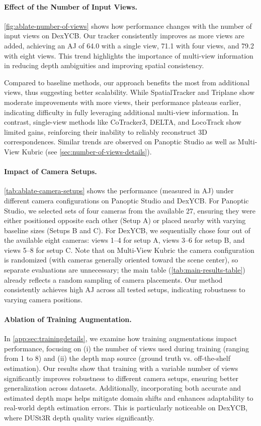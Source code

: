 \documentclass[10pt,twocolumn,letterpaper]{article}
\begin{document}
\paragraph{Effect of the Number of Input Views.}  
\cref{fig:ablate-number-of-views} shows how performance changes with the number of input views on DexYCB. Our tracker consistently improves as more views are added, achieving an AJ of 64.0 with a single view, 71.1 with four views, and 79.2 with eight views. This trend highlights the importance of multi-view information in reducing depth ambiguities and improving spatial consistency.

Compared to baseline methods, our approach benefits the most from additional views, thus suggesting better scalability. While SpatialTracker and Triplane show moderate improvements with more views, their performance plateaus earlier, indicating difficulty in fully leveraging additional multi-view information. In contrast, single-view methods like CoTracker3, DELTA, and LocoTrack show limited gains, reinforcing their inability to reliably reconstruct 3D correspondences. Similar trends are observed on Panoptic Studio as well as Multi-View Kubric (see \cref{sec:number-of-views-details}).


\paragraph{Impact of Camera Setups.}  
\cref{tab:ablate-camera-setups} shows the performance (measured in AJ) under different camera configurations on Panoptic Studio and DexYCB. For Panoptic Studio, we selected sets of four cameras from the available 27, ensuring they were either positioned opposite each other (Setup A) or placed nearby with varying baseline sizes (Setups B and C). For DexYCB, we sequentially chose four out of the available eight cameras: views 1--4 for setup A, views 3--6 for setup B, and views 5--8 for setup C. Note that on Multi-View Kubric the camera configuration is randomized (with cameras generally oriented toward the scene center), so separate evaluations are unnecessary; the main table (\cref{tab:main-results-table}) already reflects a random sampling of camera placements. Our method consistently achieves high AJ across all tested setups, indicating robustness to varying camera positions.

\paragraph{Ablation of Training Augmentation.}
In \cref{app:sec:trainingdetails}, we examine how training augmentations impact performance, focusing on (i) the number of views used during training (ranging from 1 to 8) and (ii) the depth map source (ground truth vs. off-the-shelf estimation). Our results show that training with a variable number of views significantly improves robustness to different camera setups, ensuring better generalization across datasets. Additionally, incorporating both accurate and estimated depth maps helps mitigate domain shifts and enhances adaptability to real-world depth estimation errors. This is particularly noticeable on DexYCB, where DUSt3R depth quality varies significantly.
\end{document}
